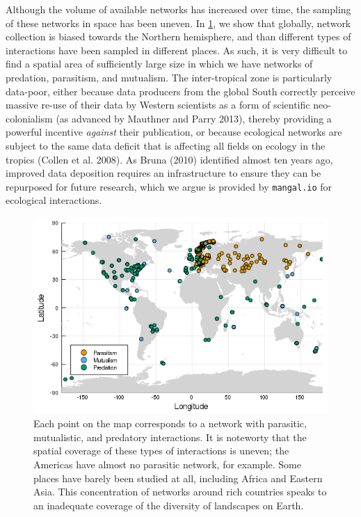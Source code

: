 Although the volume of available networks has increased over time, the
sampling of these networks in space has been uneven. In
\cref{fig:spatial}, we show that globally, network
collection is biased towards the Northern hemisphere, and than different
types of interactions have been sampled in different places. As such, it
is very difficult to find a spatial area of sufficiently large size in
which we have networks of predation, parasitism, and mutualism. The
inter-tropical zone is particularly data-poor, either because data
producers from the global South correctly perceive massive re-use of
their data by Western scientists as a form of scientific neo-colonialism
(as advanced by Mauthner and Parry 2013), thereby providing a powerful
incentive \emph{against} their publication, or because ecological
networks are subject to the same data deficit that is affecting all
fields on ecology in the tropics (Collen et al. 2008). As Bruna (2010)
identified almost ten years ago, improved data deposition requires an
infrastructure to ensure they can be repurposed for future research,
which we argue is provided by \texttt{mangal.io} for ecological
interactions.

\begin{figure}
\centering
\includegraphics{figures/figure_01_c.png}
\caption{Each point on the map corresponds to a network with parasitic,
mutualistic, and predatory interactions. It is noteworty that the
spatial coverage of these types of interactions is uneven; the Americas
have almost no parasitic network, for example. Some places have barely
been studied at all, including Africa and Eastern Asia. This
concentration of networks around rich countries speaks to an inadequate
coverage of the diversity of landscapes on Earth.\label{fig:spatial}}
\end{figure}

